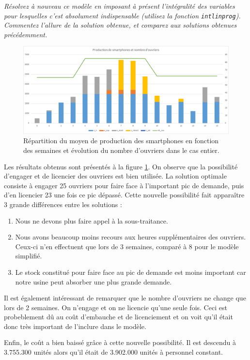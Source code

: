 \question %
\emph{Résolvez à nouveau ce modèle en imposant à présent l'intégralité des
variables pour lesquelles c'est absolument indispensable
(utilisez la fonction \texttt{intlinprog}).
Commentez l'allure de la solution obtenue,
et comparez aux solutions obtenues précédemment.}

\begin{figure}[H]
  \begin{center}
    \includegraphics[scale = 0.8]{img/grapheProductionOuv.png}
	  \caption{Répartition du moyen de production des smartphones en fonction des semaines et évolution du nombre d'ouvriers dans le cas entier.}
	  \label{fig:grapheProductionOuv}
  \end{center}
\end{figure}

Les résultats obtenus sont présentés à la figure \ref{fig:grapheProductionOuv}. On observe que la possibilité d'engager et de licencier des ouvriers est bien utilisée. La solution optimale consiste à engager 25 ouvriers pour faire face à l'important pic de demande, puis d'en licencier 23 une fois ce pic dépassé. Cette nouvelle possibilité fait apparaître 3 grande différences entre les solutions : 
\begin{enumerate}
\item Nous ne devons plus faire appel à la sous-traitance.
\item Nous avons beaucoup moins recours aux heures supplémentaires des ouvriers. Ceux-ci n'en effectuent que lors de 3 semaines, comparé à 8 pour le modèle simplifié.
\item Le stock constitué pour faire face au pic de demande est moins important car notre usine peut absorber une plus grande demande.
\end{enumerate}
Il est également intéressant de remarquer que le nombre d'ouvriers ne change que lors de 2 semaines. On n'engage et on ne licencie qu'une seule fois. Ceci est probeblement dû au coût d'embauche et de licenciement et on voit qu'il était donc très important de l'inclure dans le modèle. 

Enfin, le coût a bien baissé grâce à cette nouvelle possibilité. Il est descendu à 3.755.300 unités alors qu'il était de 3.902.000 unités à personnel constant.